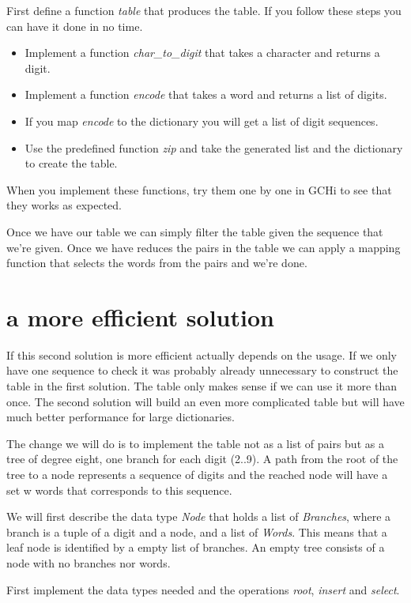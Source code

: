 \documentclass[a4paper,11pt]{article}
\newcommand{\nnsection}[1]{
\section*{#1}
\addcontentsline{toc}{section}{#1}
}
\begin{document}
First define a function {\em table} that produces the table. If you
follow these steps you can have it done in no time.

\begin{itemize}
\item Implement a function {\em char\_to\_digit} that takes a
  character and returns a digit.

\item Implement a function {\em encode} that takes a word and returns
  a list of digits.

\item If you map {\em encode} to the dictionary you will get a list of
  digit sequences.  

\item Use the predefined function {\em zip} and
  take the generated list and the dictionary to create the table.
\end{itemize}

When you implement these functions, try them one by one in GCHi to see
that they works as expected.

Once we have our table we can simply filter the table given the
sequence that we're given. Once we have reduces the pairs in the table
we can apply a mapping function that selects the words from the pairs
and we're done.

\nnsection{a more efficient solution}

If this second solution is more efficient actually depends on the
usage. If we only have one sequence to check it was probably already
unnecessary to construct the table in the first solution. The table
only makes sense if we can use it more than once. The second solution
will build an even more complicated table but will have much better
performance for large dictionaries.

The change we will do is to implement the table not as a list of
pairs but as a tree of degree eight, one branch for each digit (2..9). A path
from the root of the tree to a node represents a sequence of digits
and the reached node will have a set w words that corresponds to this
sequence.

We will first describe the data type {\em Node} that holds a list of
{\em Branches}, where a branch is a tuple of a digit and a node, and a
list of {\em Words}. This means that a leaf node is identified by a
empty list of branches. An empty tree consists of a node with no
branches nor words.

First implement the data types needed and the operations {\em root},
{\em insert} and {\em select}.
\end{document}
